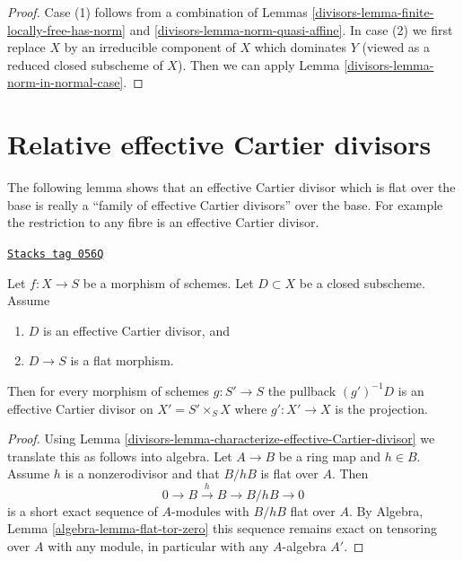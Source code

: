 \begin{proof}

Case (1) follows from a combination of Lemmas
\ref{divisors-lemma-finite-locally-free-has-norm} and \ref{divisors-lemma-norm-quasi-affine}.
In case (2) we first replace $X$ by an irreducible component of $X$
which dominates $Y$ (viewed as a reduced closed subscheme of $X$).
Then we can apply Lemma \ref{divisors-lemma-norm-in-normal-case}.
\end{proof}

\section{Relative effective Cartier divisors}
\label{divisors-section-effective-Cartier-morphisms}
The following lemma shows that an effective Cartier divisor which is
flat over the base is really a ``family of effective Cartier divisors''
over the base. For example the restriction to any fibre is an effective
Cartier divisor.

\begin{lemma}
\label{divisors-lemma-relative-Cartier}
\href{https://stacks.math.columbia.edu/tag/056Q}{\texttt{Stacks tag 056Q}}

Let $f : X \to S$ be a morphism of schemes.
Let $D \subset X$ be a closed subscheme.
Assume
\begin{enumerate}
\item $D$ is an effective Cartier divisor, and
\item $D \to S$ is a flat morphism.
\end{enumerate}
Then for every morphism of schemes $g : S' \to S$ the pullback
$(g')^{-1}D$ is an effective Cartier divisor on $X' = S' \times_S X$
where $g' : X' \to X$ is the projection.
\end{lemma}

\begin{proof}

Using
Lemma \ref{divisors-lemma-characterize-effective-Cartier-divisor}
we translate this as follows into algebra. Let $A \to B$ be a ring
map and $h \in B$. Assume $h$ is a nonzerodivisor and that $B/hB$ is flat
over $A$. Then
$$
0 \to B \xrightarrow{h} B \to B/hB \to 0
$$
is a short exact sequence of $A$-modules with $B/hB$ flat over $A$. By
Algebra, Lemma \ref{algebra-lemma-flat-tor-zero}
this sequence remains exact on tensoring over $A$ with any module, in
particular with any $A$-algebra $A'$.
\end{proof}

